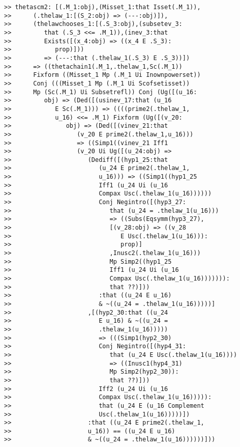 \documentclass[12pt]{article}
\begin{document}
\begin{verbatim}
>> thetascm2: [(.M_1:obj),(Misset_1:that Isset(.M_1)),
>>      (.thelaw_1:[(S_2:obj) => (---:obj)]),
>>      (thelawchooses_1:[(.S_3:obj),(subsetev_3:
>>         that (.S_3 <<= .M_1)),(inev_3:that
>>         Exists([(x_4:obj) => ((x_4 E .S_3):
>>            prop)]))
>>         => (---:that (.thelaw_1(.S_3) E .S_3))])
>>      => ((thetachain1(.M_1,.thelaw_1,Sc(.M_1))
>>      Fixform ((Misset_1 Mp (.M_1 Ui Inownpowerset))
>>      Conj (((Misset_1 Mp (.M_1 Ui Scofsetisset))
>>      Mp (Sc(.M_1) Ui Subsetrefl)) Conj (Ug([(u_16:
>>         obj) => (Ded([(usinev_17:that (u_16
>>            E Sc(.M_1))) => ((((prime2(.thelaw_1,
>>            u_16) <<= .M_1) Fixform (Ug([(v_20:
>>               obj) => (Ded([(vinev_21:that
>>                  (v_20 E prime2(.thelaw_1,u_16)))
>>                  => ((Simp1((vinev_21 Iff1
>>                  (v_20 Ui Ug([(u_24:obj) =>
>>                     (Dediff([(hyp1_25:that
>>                        (u_24 E prime2(.thelaw_1,
>>                        u_16))) => ((Simp1((hyp1_25
>>                        Iff1 (u_24 Ui (u_16
>>                        Compax Usc(.thelaw_1(u_16))))))
>>                        Conj Negintro([(hyp3_27:
>>                           that (u_24 = .thelaw_1(u_16)))
>>                           => ((Subs(Eqsymm(hyp3_27),
>>                           [(v_28:obj) => ((v_28
>>                              E Usc(.thelaw_1(u_16))):
>>                              prop)]
>>                           ,Inusc2(.thelaw_1(u_16)))
>>                           Mp Simp2((hyp1_25
>>                           Iff1 (u_24 Ui (u_16
>>                           Compax Usc(.thelaw_1(u_16))))))):
>>                           that ??)]))
>>                        :that ((u_24 E u_16)
>>                        & ~((u_24 = .thelaw_1(u_16)))))]
>>                     ,[(hyp2_30:that ((u_24
>>                        E u_16) & ~((u_24 =
>>                        .thelaw_1(u_16)))))
>>                        => (((Simp1(hyp2_30)
>>                        Conj Negintro([(hyp4_31:
>>                           that (u_24 E Usc(.thelaw_1(u_16))))
>>                           => ((Inusc1(hyp4_31)
>>                           Mp Simp2(hyp2_30)):
>>                           that ??)]))
>>                        Iff2 (u_24 Ui (u_16
>>                        Compax Usc(.thelaw_1(u_16))))):
>>                        that (u_24 E (u_16 Complement
>>                        Usc(.thelaw_1(u_16)))))])
>>                     :that ((u_24 E prime2(.thelaw_1,
>>                     u_16)) == ((u_24 E u_16)
>>                     & ~((u_24 = .thelaw_1(u_16))))))]))

\end{verbatim}
\end{document}
